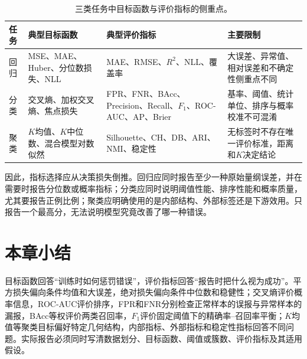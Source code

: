 \begin{table}[htbp]
\centering
\caption{三类任务中目标函数与评价指标的侧重点。}
\label{tab:pipeline-objectives-metrics}
\begin{tabular}{p{}p{}p{}p{}}
\toprule
任务 & 典型目标函数 & 典型评价指标 & 主要限制 \\
\midrule
回归 & MSE、MAE、Huber、分位数损失、NLL & MAE、RMSE、$R^2$、NLL、覆盖率 & 大误差、异常值、相对误差和不确定性侧重点不同 \\
分类 & 交叉熵、加权交叉熵、焦点损失 & FPR、FNR、BAcc、Precision、Recall、$F_1$、ROC-AUC、AP、Brier & 基率、阈值、统计单位、排序与概率校准不可混淆 \\
聚类 & $K$均值、$K$中位数、混合模型对数似然 & Silhouette、CH、DB、ARI、NMI、稳定性 & 无标签时不存在唯一评价标准，距离和$K$决定结论 \\
\bottomrule
\end{tabular}
\end{table}

因此，指标选择应从决策损失倒推。回归应同时报告至少一种原始量纲误差，并在需要时报告分位数或概率指标；分类应同时说明阈值性能、排序性能和概率质量，尤其要报告正例比例；聚类应明确使用的是内部结构、外部标签还是下游效用。只报告一个最高分，无法说明模型究竟改善了哪一种错误。

\section*{本章小结}
目标函数回答“训练时如何惩罚错误”，评价指标回答“报告时把什么视为成功”。平方损失偏向条件均值和大误差，绝对损失偏向条件中位数和稳健性；交叉熵评价概率信息，ROC-AUC评价排序，FPR和FNR分别检查正常样本的误报与异常样本的漏报，BAcc等权评价两类召回率，$F_1$评价固定阈值下的精确率--召回率平衡；$K$均值等聚类目标偏好特定几何结构，内部指标、外部指标和稳定性指标回答不同问题。实际报告必须同时写清数据划分、目标函数、阈值或簇数、评价指标及其适用假设。
